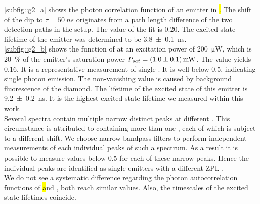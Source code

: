 		\cref{subfig::g2_a} shows the photon correlation function of an emitter in \hl. 
		The shift of the dip to $\tau=\SI{50}{ns}$ originates from a path length difference of the two detection paths in the \HBT setup.
		The \gtz value of the fit is \num{0.20}.
		The excited state lifetime of the emitter was determined to be \SI[separate-uncertainty]{3.8\pm0.1}{ns}.
		\\
		\cref{subfig::g2_b} shows the \gt function of \embroad at an excitation power of \SI{200}{\micro\W}, which is \SI{20}{\percent} of the emitter's saturation power $P_{sat}=\SI[separate-uncertainty]{1.0\pm0.1}{mW}$.
		The \gtz value yields \num{0.16}.
		It is a representative \gt measurement of single \sivs.
		It is well below \num{0.5}, indicating single photon emission.
		The non-vanishing \gtz value is caused by background fluorescence of the diamond.
		The lifetime of the excited state of this emitter is \SI[separate-uncertainty]{9.2\pm0.2}{ns}.
		It is the highest excited state lifetime we measured within this work.
		\\
		Several \nd \pl spectra contain multiple narrow distinct peaks at different \wls.
		This circumstance is attributed to \nds containing more than one \siv, each of which is subject to a different \ZPL \wl shift.
		We choose narrow bandpass filters to perform independent measurements of each individual peaks of such a spectrum.
		As a result it is possible to measure \gtz values below \num{0.5} for each of these narrow peaks.
		Hence the individual peaks are identified as single emitters with a different ZPL \cwl.
		\\
		We do not see a systematic difference regarding the photon autocorrelation functions of \hl and \vl, both reach similar \gtz values.
		Also, the timescales of the excited state lifetimes coincide.

